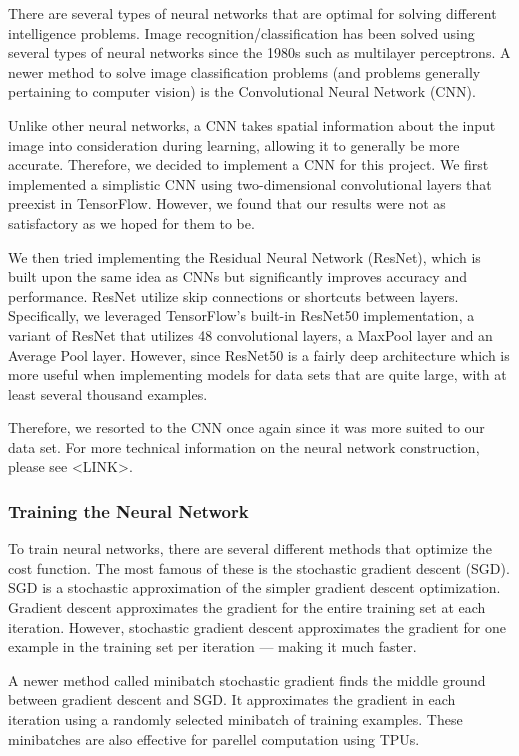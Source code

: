 \documentclass[11pt]{article}
\begin{document}
  There are several types of neural networks that are optimal for solving different 
  intelligence problems. Image recognition/classification has been solved using 
  several types of neural networks since the 1980s such as multilayer perceptrons. 
  A newer method to solve image classification problems (and problems generally 
  pertaining to computer vision) is the Convolutional Neural Network (CNN). 
  
  Unlike other neural networks, a CNN takes spatial information about the input image 
  into consideration during learning, allowing it to generally be more accurate. Therefore, 
  we decided to implement a CNN for this project. We first implemented a simplistic 
  CNN using two-dimensional convolutional layers that preexist in TensorFlow. However, 
  we found that our results were not as satisfactory as we hoped for them to be.

  We then tried implementing the Residual Neural Network (ResNet), which is built
  upon the same idea as CNNs but significantly improves accuracy and performance. 
  ResNet utilize skip connections or shortcuts between layers. Specifically, we leveraged 
  TensorFlow's built-in ResNet50 implementation, a variant of ResNet that utilizes 
  48 convolutional layers, a MaxPool layer and an Average Pool layer. However, since 
  ResNet50 is a fairly deep architecture which is more useful when implementing models 
  for data sets that are quite large, with at least several thousand examples.

  Therefore, we resorted to the CNN once again since it was more suited to 
  our data set.
  For more technical information on the neural network construction, please see <LINK>.
  
  \subsubsection{Training the Neural Network}
  To train neural networks, there are several different methods that optimize 
  the cost function. The most famous of these is the stochastic gradient descent (SGD). 
  SGD is a stochastic approximation of the simpler gradient descent optimization. Gradient 
  descent approximates the gradient for the entire training set at each iteration. However, 
  stochastic gradient descent approximates the gradient for one example in the training set 
  per iteration --- making it much faster. 

  A newer method called minibatch stochastic gradient finds the middle ground between 
  gradient descent and SGD. It approximates the gradient in each iteration using a randomly 
  selected minibatch of training examples. These minibatches are also effective for 
  parellel computation using TPUs. 
\end{document}
